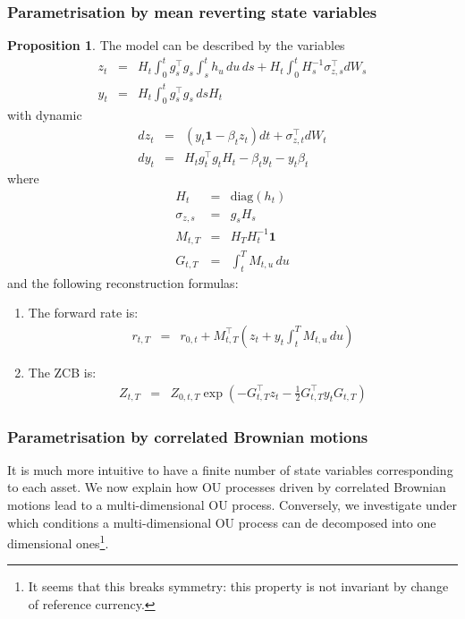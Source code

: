 \documentclass[11pt,english]{amsart}
\newcommand{\diag}{\mathrm{diag}}
\newcommand{\vun}{\mathbf{1}}
\theoremstyle{definition}
\newtheorem{prop}{Proposition}
\begin{document}
\subsubsection{Parametrisation by mean reverting state variables}%


\begin{prop}
The model can be described by the variables 
\begin{eqnarray}
  z_t &=& H_t \int_0^t g_s^\top g_s \int_s^t h_u\,du  \, ds +  H_t \int_0^t H_s^{-1}\sigma_{z,s}^\top dW_s \\
  y_t &=& H_t \int_0^t g_s^\top g_s \, ds  H_t
\end{eqnarray}
with dynamic
\begin{eqnarray}
  dz_t &=& \left(y_t\vun - \beta_tz_t\right)dt + \sigma_{z,t}^\top dW_t   \\
  dy_t &=& H_tg_t^\top g_tH_t - \beta_ty_t - y_t\beta_t  
\end{eqnarray}
where
\begin{eqnarray}
  H_{t} &=& \diag(h_t)  \\
  \sigma_{z,s} &=& g_sH_s  \\ 
  M_{t,T} &=& H_T H_t^{-1} \vun \\
  G_{t,T} &=& \int_t^T M_{t,u} \, du
\end{eqnarray}
and the following reconstruction formulas:
\begin{enumerate}
\item The forward rate is:
\begin{eqnarray}
  r_{t,T} &=& r_{0,t} + M_{t,T}^\top\left( z_t + y_t \int_t^T M_{t,u} \, du \right) 
\end{eqnarray}
\item The ZCB is:
\begin{eqnarray}
  Z_{t,T} &=& Z_{0,t,T} \exp\left( -G_{t,T} ^\top z_t -\frac{1}{2} G_{t,T} ^\top y_t G_{t,T}   \right) 
\end{eqnarray}
\end{enumerate}
\end{prop}


\subsubsection{Parametrisation by correlated Brownian motions}%
It is much more intuitive to have a finite number of state variables corresponding to each asset. 
We now explain how OU processes driven by correlated Brownian motions lead to a multi-dimensional OU process. Conversely, we investigate under which conditions a multi-dimensional OU process can de decomposed into one dimensional ones\footnote{It seems that this breaks symmetry: this property is not invariant by change of reference currency.}.
\end{document}
